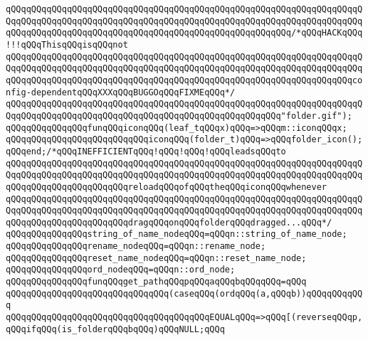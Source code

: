\verb|qQQqqQQqqQQqqQQqqQQqqQQqqQQqqQQqqQQqqQQqqQQqqQQqqQQqqQQqqQQqqQQqqQQqqQQqqQQqqQQqqQQqqQQqqQQqqQQqqQQqqQQqqQQqqQQqqQQqqQQqqQQqqQQqqQQqqQQqqQQqqQQqqQQqqQQqqQQqqQQqqQQqqQQqqQQqqQQqqQQqqQQqqQQqqQQqqQQq/*qQQqHACKqQQq!!!qQQqThisqQQqisqQQqnot|\newline
\verb|qQQqqQQqqQQqqQQqqQQqqQQqqQQqqQQqqQQqqQQqqQQqqQQqqQQqqQQqqQQqqQQqqQQqqQQqqQQqqQQqqQQqqQQqqQQqqQQqqQQqqQQqqQQqqQQqqQQqqQQqqQQqqQQqqQQqqQQqqQQqqQQqqQQqqQQqqQQqqQQqqQQqqQQqqQQqqQQqqQQqqQQqqQQqqQQqqQQqqQQqqQQqqQQqconfig-dependentqQQqXXXqQQqBUGGOqQQqFIXMEqQQq*/|\newline
\verb|qQQqqQQqqQQqqQQqqQQqqQQqqQQqqQQqqQQqqQQqqQQqqQQqqQQqqQQqqQQqqQQqqQQqqQQqqQQqqQQqqQQqqQQqqQQqqQQqqQQqqQQqqQQqqQQqqQQqqQQqqQQq"folder.gif");|\newline
\newline
\verb|qQQqqQQqqQQqqQQqfunqQQqiconqQQq(leaf_tqQQqx)qQQq=>qQQqm::iconqQQqx;|\newline
\verb|qQQqqQQqqQQqqQQqqQQqqQQqqQQqiconqQQq(folder_t)qQQq=>qQQqfolder_icon();qQQqend;/*qQQqINEFFICIENTqQQq!qQQq!qQQq!qQQqleadsqQQqto|\newline
\verb|qQQqqQQqqQQqqQQqqQQqqQQqqQQqqQQqqQQqqQQqqQQqqQQqqQQqqQQqqQQqqQQqqQQqqQQqqQQqqQQqqQQqqQQqqQQqqQQqqQQqqQQqqQQqqQQqqQQqqQQqqQQqqQQqqQQqqQQqqQQqqQQqqQQqqQQqqQQqqQQqqQQqreloadqQQqofqQQqtheqQQqiconqQQqwhenever|\newline
\verb|qQQqqQQqqQQqqQQqqQQqqQQqqQQqqQQqqQQqqQQqqQQqqQQqqQQqqQQqqQQqqQQqqQQqqQQqqQQqqQQqqQQqqQQqqQQqqQQqqQQqqQQqqQQqqQQqqQQqqQQqqQQqqQQqqQQqqQQqqQQqqQQqqQQqqQQqqQQqqQQqqQQqdragqQQqonqQQqfolderqQQqdragged...qQQq*/|\newline
\newline
\verb|qQQqqQQqqQQqqQQqstring_of_name_nodeqQQq=qQQqn::string_of_name_node;|\newline
\verb|qQQqqQQqqQQqqQQqrename_nodeqQQq=qQQqn::rename_node;|\newline
\verb|qQQqqQQqqQQqqQQqreset_name_nodeqQQq=qQQqn::reset_name_node;|\newline
\verb|qQQqqQQqqQQqqQQqord_nodeqQQq=qQQqn::ord_node;|\newline
\newline
\verb|qQQqqQQqqQQqqQQqfunqQQqget_pathqQQqpqQQqaqQQqbqQQqqQQq=qQQq|\newline
\verb|qQQqqQQqqQQqqQQqqQQqqQQqqQQqqQQq(caseqQQq(ordqQQq(a,qQQqb))qQQqqQQqqQQq|\newline
\verb|qQQqqQQqqQQqqQQqqQQqqQQqqQQqqQQqqQQqqQQqEQUALqQQq=>qQQq[(reverseqQQqp,qQQqifqQQq(is_folderqQQqbqQQq)qQQqNULL;qQQq|\newline
